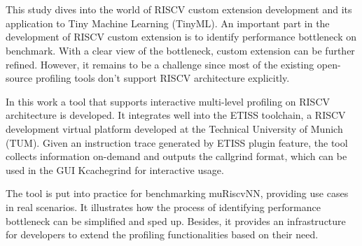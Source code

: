 \chapter{\abstractname}

This study dives into the world of RISCV custom extension development and its application to Tiny Machine Learning (TinyML). An important part in the development of
RISCV custom extension is to identify performance bottleneck on benchmark. With a clear view of the bottleneck, custom extension can be further refined.
However, it remains to be a challenge since most of the existing open-source profiling tools don't support RISCV architecture explicitly.


In this work a tool that supports interactive multi-level profiling on RISCV architecture is developed. It integrates well into the ETISS toolchain, a RISCV development
virtual platform developed at the Technical University of Munich (TUM). Given an instruction trace generated by ETISS plugin feature, the tool collects information on-demand
and outputs the callgrind format, which can be used in the GUI Kcachegrind for interactive usage.


The tool is put into practice for benchmarking muRiscvNN, providing use cases in real scenarios. It illustrates how the process of identifying performance bottleneck can
be simplified and sped up. Besides, it provides an infrastructure for developers to extend the profiling functionalities based on their need.